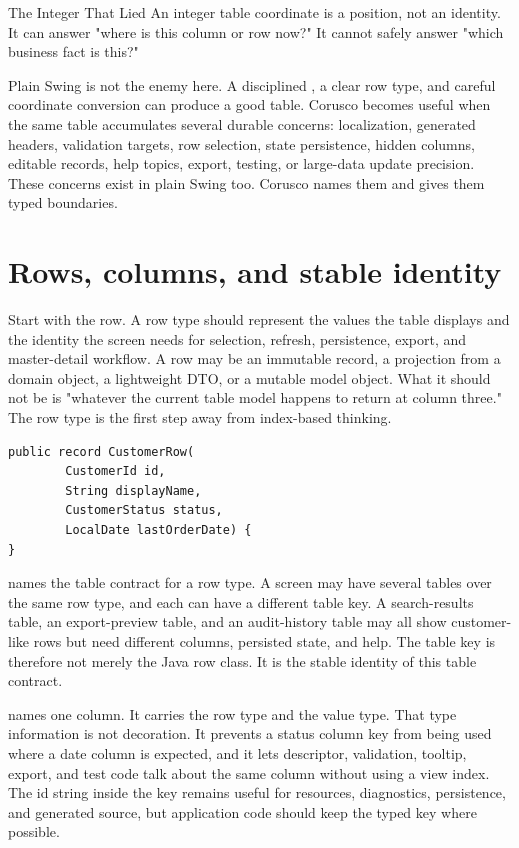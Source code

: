\begin{pitfallbox}{The Integer That Lied}
An integer table coordinate is a position, not an identity. It can answer
"where is this column or row now?" It cannot safely answer "which business fact
is this?"
\end{pitfallbox}

Plain Swing is not the enemy here. A disciplined , a
clear row type, and careful coordinate conversion can produce a good table.
Corusco becomes useful when the same table accumulates several durable
concerns: localization, generated headers, validation targets, row selection,
state persistence, hidden columns, editable records, help topics, export,
testing, or large-data update precision. These concerns exist in plain Swing
too. Corusco names them and gives them typed boundaries.

\section{Rows, columns, and stable identity}

Start with the row. A row type should represent the values the table displays
and the identity the screen needs for selection, refresh, persistence, export,
and master-detail workflow. A row may be an immutable record, a projection
from a domain object, a lightweight DTO, or a mutable model object. What it
should not be is "whatever the current table model happens to return at
column three." The row type is the first step away from index-based thinking.

\begin{lstlisting}[caption={A row type before there is a JTable.}]
public record CustomerRow(
        CustomerId id,
        String displayName,
        CustomerStatus status,
        LocalDate lastOrderDate) {
}
\end{lstlisting}

 names the table contract for a row type. A screen may have
several tables over the same row type, and each can have a different table
key. A search-results table, an export-preview table, and an audit-history
table may all show customer-like rows but need different columns, persisted
state, and help. The table key is therefore not merely the Java row class. It
is the stable identity of this table contract.

 names one column. It carries the row type and the value
type. That type information is not decoration. It prevents a status column key
from being used where a date column is expected, and it lets descriptor,
validation, tooltip, export, and test code talk about the same column without
using a view index. The id string inside the key remains useful for resources,
diagnostics, persistence, and generated source, but application code should
keep the typed key where possible.

